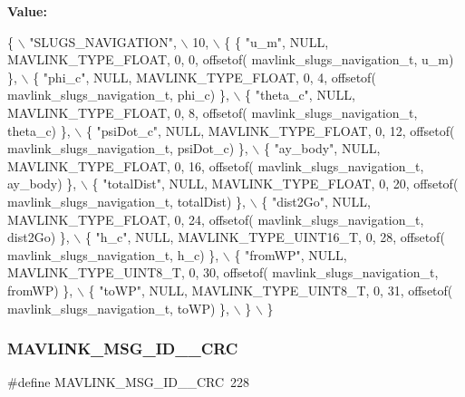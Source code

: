 {\bfseries Value\+:}
\begin{DoxyCode}
\{ \(\backslash\)
    \textcolor{stringliteral}{"SLUGS\_NAVIGATION"}, \(\backslash\)
    10, \(\backslash\)
    \{  \{ \textcolor{stringliteral}{"u\_m"}, NULL, MAVLINK_TYPE_FLOAT, 0, 0, offsetof(
      mavlink_slugs_navigation_t, u\_m) \}, \(\backslash\)
         \{ \textcolor{stringliteral}{"phi\_c"}, NULL, MAVLINK_TYPE_FLOAT, 0, 4, offsetof(
      mavlink_slugs_navigation_t, phi\_c) \}, \(\backslash\)
         \{ \textcolor{stringliteral}{"theta\_c"}, NULL, MAVLINK_TYPE_FLOAT, 0, 8, offsetof(
      mavlink_slugs_navigation_t, theta\_c) \}, \(\backslash\)
         \{ \textcolor{stringliteral}{"psiDot\_c"}, NULL, MAVLINK_TYPE_FLOAT, 0, 12, offsetof(
      mavlink_slugs_navigation_t, psiDot\_c) \}, \(\backslash\)
         \{ \textcolor{stringliteral}{"ay\_body"}, NULL, MAVLINK_TYPE_FLOAT, 0, 16, offsetof(
      mavlink_slugs_navigation_t, ay\_body) \}, \(\backslash\)
         \{ \textcolor{stringliteral}{"totalDist"}, NULL, MAVLINK_TYPE_FLOAT, 0, 20, offsetof(
      mavlink_slugs_navigation_t, totalDist) \}, \(\backslash\)
         \{ \textcolor{stringliteral}{"dist2Go"}, NULL, MAVLINK_TYPE_FLOAT, 0, 24, offsetof(
      mavlink_slugs_navigation_t, dist2Go) \}, \(\backslash\)
         \{ \textcolor{stringliteral}{"h\_c"}, NULL, MAVLINK_TYPE_UINT16_T, 0, 28, offsetof(
      mavlink_slugs_navigation_t, h\_c) \}, \(\backslash\)
         \{ \textcolor{stringliteral}{"fromWP"}, NULL, MAVLINK_TYPE_UINT8_T, 0, 30, offsetof(
      mavlink_slugs_navigation_t, fromWP) \}, \(\backslash\)
         \{ \textcolor{stringliteral}{"toWP"}, NULL, MAVLINK_TYPE_UINT8_T, 0, 31, offsetof(
      mavlink_slugs_navigation_t, toWP) \}, \(\backslash\)
         \} \(\backslash\)
\}
\end{DoxyCode}
\mbox{\label{mavlink__msg__slugs__navigation_8h_a4c282073862c1abf9bd79d9c1f84d8cc}} 
\subsubsection{M\+A\+V\+L\+I\+N\+K\+\_\+\+M\+S\+G\+\_\+\+I\+D\+\_\+\_\+\+C\+RC}
{\footnotesize\ttfamily \#define M\+A\+V\+L\+I\+N\+K\+\_\+\+M\+S\+G\+\_\+\+I\+D\+\_\+\_\+\+C\+RC~228}

